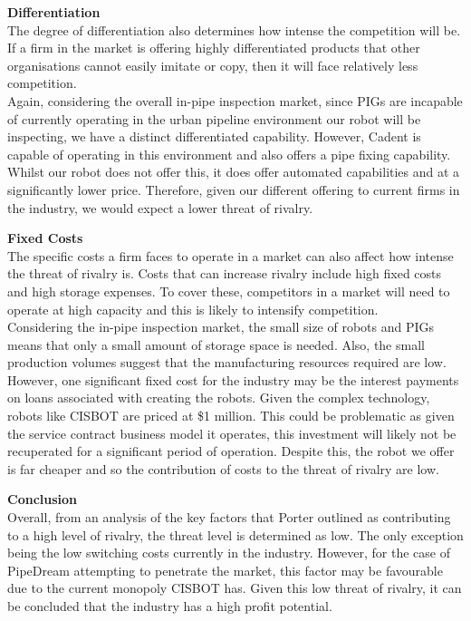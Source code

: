 \documentclass[11pt]{article}		%
\begin{document}
		        \textbf{Differentiation}\\
		        The degree of differentiation also determines how intense the competition will be. If a firm in the market is offering highly differentiated products that other organisations cannot easily imitate or copy, then it will face relatively less competition.\\
		        \hspace*{3ex}Again, considering the overall in-pipe inspection market, since PIGs are incapable of currently operating in the urban pipeline environment our robot will be inspecting, we have a distinct differentiated capability. However, Cadent is capable of operating in this environment and also offers a pipe fixing capability. Whilst our robot does not offer this, it does offer automated capabilities and at a significantly lower price. Therefore, given our different offering to current firms in the industry, we would expect a lower threat of rivalry. 
		        
		        \textbf{Fixed Costs}\\
		        The specific costs a firm faces to operate in a market can also affect how intense the threat of rivalry is. Costs that can increase rivalry include high fixed costs and high storage expenses. To cover these, competitors in a market will need to operate at high capacity and this is likely to intensify competition.\\
		        \hspace*{3ex}Considering the in-pipe inspection market, the small size of robots and PIGs means that only a small amount of storage space is needed. Also, the small production volumes suggest that the manufacturing resources required are low. However, one significant fixed cost for the industry may be the interest payments on loans associated with creating the robots. Given the complex technology, robots like CISBOT are priced at \$1 million. This could be problematic as given the service contract business model it operates, this investment will likely not be recuperated for a significant period of operation. Despite this, the robot we offer is far cheaper and so the contribution of costs to the threat of rivalry are low. 
		        
		        \textbf{Conclusion}\\
		        Overall, from an analysis of the key factors that Porter outlined as contributing to a high level of rivalry, the threat level is determined as low. The only exception being the low switching costs currently in the industry. However, for the case of PipeDream attempting to penetrate the market, this factor may be favourable due to the current monopoly CISBOT has. Given this low threat of rivalry, it can be concluded that the industry has a high profit potential.
		        
\end{document}
